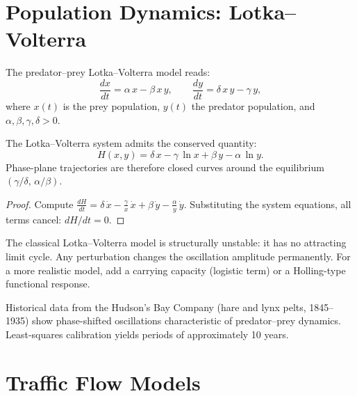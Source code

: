 \section{Population Dynamics: Lotka--Volterra}
\label{sec:lotka_volterra}

\begin{definition}
The predator--prey Lotka--Volterra model reads:
\[
  \frac{dx}{dt} = \alpha\,x - \beta\,x\,y, \qquad
  \frac{dy}{dt} = \delta\,x\,y - \gamma\,y,
\]
where $x(t)$ is the prey population, $y(t)$ the predator population,
and $\alpha, \beta, \gamma, \delta > 0$.
\end{definition}

\begin{proposition}
The Lotka--Volterra system admits the conserved quantity:
\[
  H(x,y) = \delta\,x - \gamma\,\ln x + \beta\,y - \alpha\,\ln y.
\]
Phase-plane trajectories are therefore closed curves around the
equilibrium $(\gamma/\delta,\, \alpha/\beta)$.
\end{proposition}

\begin{proof}
Compute $\frac{dH}{dt} = \delta\,\dot{x} - \frac{\gamma}{x}\,\dot{x}
+ \beta\,\dot{y} - \frac{\alpha}{y}\,\dot{y}$. Substituting the system
equations, all terms cancel: $dH/dt = 0$.
\end{proof}

\begin{attention}
The classical Lotka--Volterra model is structurally unstable: it has
no attracting limit cycle. Any perturbation changes the oscillation
amplitude permanently. For a more realistic model, add a carrying
capacity (logistic term) or a Holling-type functional response.
\end{attention}

\begin{example}
Historical data from the Hudson's Bay Company (hare and lynx pelts,
1845--1935) show phase-shifted oscillations characteristic of
predator--prey dynamics. Least-squares calibration yields periods
of approximately 10 years.
\end{example}

\section{Traffic Flow Models}
\label{sec:traffic}

